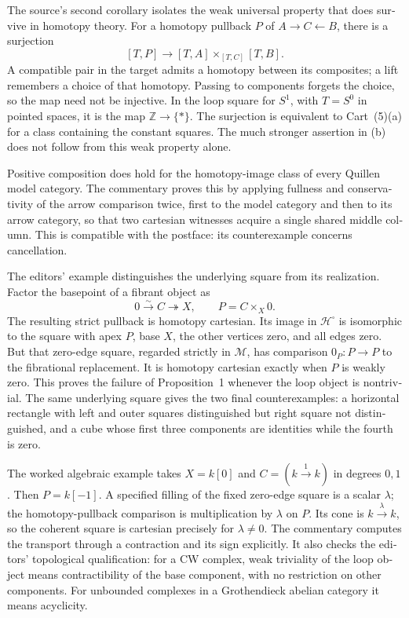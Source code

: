 \begin{otherlanguage}{english}
The source's second corollary isolates the weak universal property that does survive in homotopy theory. For a homotopy pullback $P$ of $A\to C\leftarrow B$, there is a surjection
\[
[T,P]\longrightarrow[T,A]\times_{[T,C]}[T,B].
\]
A compatible pair in the target admits a homotopy between its composites; a lift remembers a choice of that homotopy. Passing to components forgets the choice, so the map need not be injective. In the loop square for $S^1$, with $T=S^0$ in pointed spaces, it is the map $\mathbb Z\to\{*\}$. The surjection is equivalent to Cart~(5)(a) for a class containing the constant squares. The much stronger assertion in (b) does not follow from this weak property alone.

Positive composition does hold for the homotopy-image class of every Quillen model category. The commentary proves this by applying fullness and conservativity of the arrow comparison twice, first to the model category and then to its arrow category, so that two cartesian witnesses acquire a single shared middle column. This is compatible with the postface: its counterexample concerns cancellation.

The editors' example distinguishes the underlying square from its realization. Factor the basepoint of a fibrant object as
\[
0\xrightarrow{\sim}C\twoheadrightarrow X,
\qquad P=C\times_X0.
\]
The resulting strict pullback is homotopy cartesian. Its image in $\mathcal H^{\square}$ is isomorphic to the square with apex $P$, base $X$, the other vertices zero, and all edges zero. But that zero-edge square, regarded strictly in $\mathcal M$, has comparison $0_P:P\to P$ to the fibrational replacement. It is homotopy cartesian exactly when $P$ is weakly zero. This proves the failure of Proposition~1 whenever the loop object is nontrivial. The same underlying square gives the two final counterexamples: a horizontal rectangle with left and outer squares distinguished but right square not distinguished, and a cube whose first three components are identities while the fourth is zero.

The worked algebraic example takes $X=k[0]$ and $C=(k\xrightarrow1k)$ in degrees $0,1$. Then $P=k[-1]$. A specified filling of the fixed zero-edge square is a scalar $\lambda$; the homotopy-pullback comparison is multiplication by $\lambda$ on $P$. Its cone is $k\xrightarrow\lambda k$, so the coherent square is cartesian precisely for $\lambda\ne0$. The commentary computes the transport through a contraction and its sign explicitly. It also checks the editors' topological qualification: for a CW complex, weak triviality of the loop object means contractibility of the base component, with no restriction on other components. For unbounded complexes in a Grothendieck abelian category it means acyclicity.


\end{otherlanguage}
